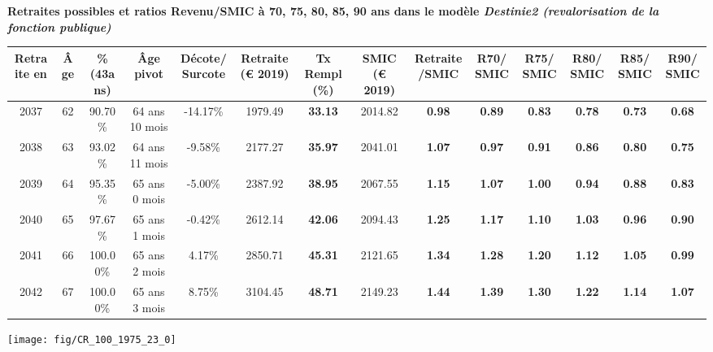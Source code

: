  \vspace{0.1cm} 
{\bf \noindent Retraites possibles et ratios Revenu/SMIC à 70, 75, 80, 85, 90 ans dans le modèle \emph{Destinie2 (revalorisation de la fonction publique)}}  
 
\begin{adjustbox}{max width=\textwidth} 
\begin{tabular}[htb]{|c|c||c|c|c||c|c||c|c||c|c|c|c|c|} 
\hline 
 Retraite en &  Âge &  \%(43ans) &  Âge pivot &  Décote/Surcote &  Retraite (\euro{} 2019) &  Tx Rempl(\%) &  SMIC (\euro{} 2019) &  Retraite/SMIC &  R70/SMIC &  R75/SMIC &  R80/SMIC &  R85/SMIC &  R90/SMIC \\ 
\hline \hline 
 2037 &  62 &  90.70\% &  64 ans 10 mois &  -14.17\% &  1979.49 &  {\bf 33.13} &  2014.82 &  {\bf {\color{red} 0.98}} &  {\bf {\color{red} 0.89}} &  {\bf {\color{red} 0.83}} &  {\bf {\color{red} 0.78}} &  {\bf {\color{red} 0.73}} &  {\bf {\color{red} 0.68}} \\ 
\hline 
 2038 &  63 &  93.02\% &  64 ans 11 mois &  -9.58\% &  2177.27 &  {\bf 35.97} &  2041.01 &  {\bf 1.07} &  {\bf {\color{red} 0.97}} &  {\bf {\color{red} 0.91}} &  {\bf {\color{red} 0.86}} &  {\bf {\color{red} 0.80}} &  {\bf {\color{red} 0.75}} \\ 
\hline 
 2039 &  64 &  95.35\% &  65 ans 0 mois &  -5.00\% &  2387.92 &  {\bf 38.95} &  2067.55 &  {\bf 1.15} &  {\bf 1.07} &  {\bf 1.00} &  {\bf {\color{red} 0.94}} &  {\bf {\color{red} 0.88}} &  {\bf {\color{red} 0.83}} \\ 
\hline 
 2040 &  65 &  97.67\% &  65 ans 1 mois &  -0.42\% &  2612.14 &  {\bf 42.06} &  2094.43 &  {\bf 1.25} &  {\bf 1.17} &  {\bf 1.10} &  {\bf 1.03} &  {\bf {\color{red} 0.96}} &  {\bf {\color{red} 0.90}} \\ 
\hline 
 2041 &  66 &  100.00\% &  65 ans 2 mois &  4.17\% &  2850.71 &  {\bf 45.31} &  2121.65 &  {\bf 1.34} &  {\bf 1.28} &  {\bf 1.20} &  {\bf 1.12} &  {\bf 1.05} &  {\bf {\color{red} 0.99}} \\ 
\hline 
 2042 &  67 &  100.00\% &  65 ans 3 mois &  8.75\% &  3104.45 &  {\bf 48.71} &  2149.23 &  {\bf 1.44} &  {\bf 1.39} &  {\bf 1.30} &  {\bf 1.22} &  {\bf 1.14} &  {\bf 1.07} \\ 
\hline 
\hline 
\end{tabular} 
\end{adjustbox} 
 
 \vspace{0.1cm} 

 {\hspace{-2.2cm}\texttt{[image: fig/CR\_100\_1975\_23\_0]}} 


